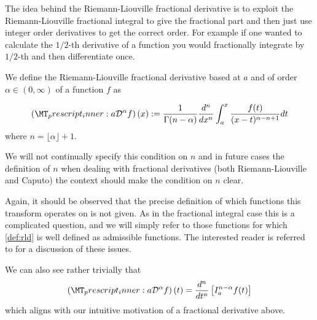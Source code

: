The idea behind the Riemann-Liouville fractional derivative is to exploit the Riemann-Liouville fractional integral to give the fractional part and then just use integer order derivatives to get the correct order. For example if one wanted to calculate the $ 1/2$-th derivative of a function you would fractionally integrate by $1/2$-th and then differentiate once.
\begin{mdframed}[innertopmargin=10pt]
\begin{definition}
We define the Riemann-Liouville fractional derivative based at $ a $ and of order $ \alpha \in (0, \infty) $ of a function $ f $ as

\begin{align}
    \label{def:rld}
    \rld{a}{}{\alpha}{f}(x) := \frac{1}{\Gamma(n-\alpha)} \frac{d^n}{dx^n} \int_{a}^{x} \frac{f(t)}{(x-t)^{\alpha - n + 1}} dt
\end{align}
where $ n = \lfloor \alpha \rfloor + 1 $.
\end{definition}
\end{mdframed}
We will not continually specify this condition on $ n $ and in future cases the definition of $ n $ when dealing with fractional derivatives (both Riemann-Liouville and Caputo) the context should make the condition on $ n $ clear.


Again, it should be observed that the precise definition of which functions this transform operates on is not given. As in the fractional integral case this is a complicated question, and we will simply refer to those functions for which \eqref{def:rld} is well defined as admissible functions. The interested reader is referred to \cite{Samko1993} for a discussion of these issues.

We can also see rather trivially that
\begin{align}
    \label{eq:rld_rli_rel}
    \left(\prescript{}{a}{\mathcal{D}}^\alpha{f}\right)(t) = \frac{d^n}{dt^n}\left[ I_a^{n-\alpha}f(t) \right]
\end{align}
which aligns with our intuitive motivation of a fractional derivative above.

